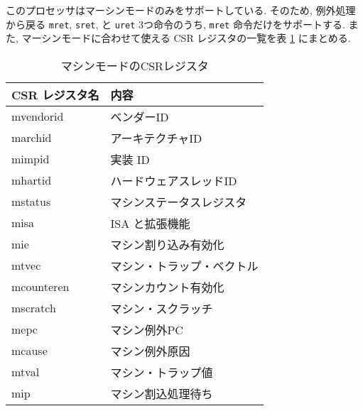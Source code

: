 \documentclass[../specifications.tex]{subfiles}
\begin{document}
  このプロセッサはマーシンモードのみをサポートしている.
  そのため, 例外処理から戻る \verb|mret|, \verb|sret|, と \verb|uret|
  3つ命令のうち, \verb|mret| 命令だけをサポートする.
  また, マーシンモードに合わせて使える CSR レジスタの一覧を表 \ref{table:csrs} にまとめる.

  \begin{table}[h]
    \begin{tabular}{|l|l|}
    \hline
    CSR レジスタ名 & 内容 \\ \hline
    mvendorid & ベンダーID \\
    marchid & アーキテクチャID \\
    mimpid & 実装 ID \\
    mhartid & ハードウェアスレッドID \\
    mstatus & マシンステータスレジスタ \\
    misa & ISA と拡張機能 \\
    mie & マシン割り込み有効化 \\
    mtvec & マシン・トラップ・ベクトル \\
    mcounteren & マシンカウント有効化 \\
    mscratch & マシン・スクラッチ \\
    mepc & マシン例外PC \\
    mcause & マシン例外原因 \\
    mtval & マシン・トラップ値 \\
    mip & マシン割込処理待ち \\ \hline
    \end{tabular}
    \caption{マシンモードのCSRレジスタ}
    \label{table:csrs}
  \end{table}
  
\end{document}
